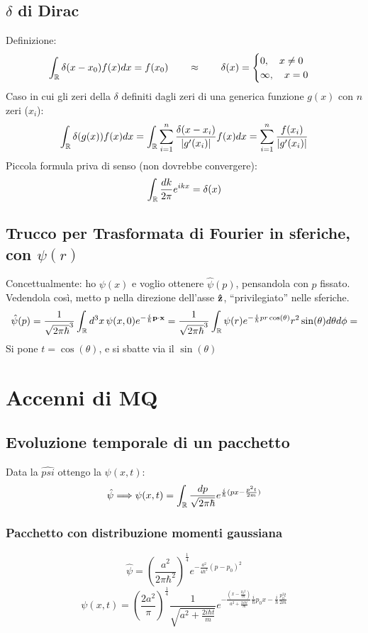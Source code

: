\subsection{$\delta$ di Dirac}
Definizione:
$$
\int_\mathbb{R} \delta(x-x_0)f(x)dx = f(x_0) \qquad \approx  \qquad 
\delta(x) = \begin{cases}
            0,\quad x\neq0 \\
	    \infty, \quad  x= 0 
\end{cases}
$$
Caso in cui gli zeri della $\delta$ definiti dagli zeri di una generica funzione $g(x)$ con $n$ zeri ($x_i$):
$$
\int_\mathbb{R} \delta(g(x))f(x)dx = \int_\mathbb{R} \sum_{i=1}^n \frac{\delta(x-x_i)}{|g'(x_i)|} f(x) dx = \sum_{i=1}^n \frac{f(x_i)}{|g'(x_i)|}
$$
Piccola formula priva di senso (non dovrebbe convergere):
$$ \int_\mathbb{R} \frac{dk}{2 \pi} e^{ikx} = \delta(x) $$
\subsection{Trucco per Trasformata di Fourier in sferiche, con $\psi(r)$}
Concettualmente: ho $\psi(x)$ e voglio ottenere $\hat{\psi}(p)$, pensandola con $p$ fissato. Vedendola così, metto p nella direzione
dell'asse $\mathbf{\hat{z}}$, ``privilegiato'' nelle sferiche.
$$
\hat{\psi}(p)= \frac{1}{\sqrt{2 \pi \hbar}^3} \int_\mathbb{R} d^3 x \, \psi(x,0) e^{-\frac{i}{\hbar} \mathbf{p}\cdot {\ensuremath{\mathbf{x}}}} =
 \frac{1}{\sqrt{2 \pi \hbar}^3} \int_\mathbb{R} \psi(r) e^{-\frac{i}{\hbar} pr \cos(\theta) } r^2 \sin(\theta) d\theta d\phi =
$$  
Si pone $ t = \cos(\theta)$, e si sbatte via il $\sin(\theta)$
\section{Accenni di MQ}
\subsection{Evoluzione temporale di un pacchetto}
Data la $\hat{psi}$ ottengo la $ \psi(x,t)$:
$$
\hat{\psi} \Longrightarrow \psi(x,t) = \int_\mathbb{R} \frac{dp}{\sqrt{2 \pi \hbar}} e^{ \frac{i}{\hbar} (px - \frac{p^2 t}{2m})}
$$
\subsubsection{Pacchetto con distribuzione momenti gaussiana}
$$
\hat{\psi} =  \left( \frac{a^2}{2 \pi \hbar^2}\right)^{\frac{1}{4}} e^{- \frac{a^2}{4 \hbar^2} (p-p_0)^2}
$$
$$
\psi(x,t)= \left(\frac{2a^2}{\pi} \right)^{\frac{1}{4}} \frac{1}{ \sqrt{ a^2 + \frac{ 2 i \hbar t }{m}}} e^{- \frac{(x-\frac{p_0t}{m})}{a^2 + \frac{2i\hbar t}{m}}
\frac{i}{\hbar} p_0 x  - 	\frac{i}{\hbar} 	\frac{p_0^2 t}{2m} }
$$
